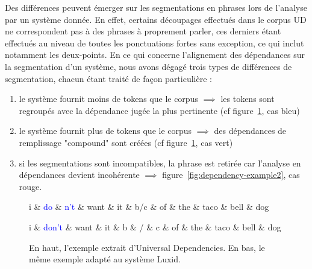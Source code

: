 \documentclass[PhD-Yoann-Dupont.tex]{subfiles}
\begin{document}
Des différences peuvent émerger sur les segmentations en phrases lors de l'analyse par un système donnée. En effet, certains découpages effectués dans le corpus UD ne correspondent pas à des phrases à proprement parler, ces derniers étant effectués au niveau de toutes les ponctuations fortes sans exception, ce qui inclut notamment les deux-points. En ce qui concerne l'alignement des dépendances sur la segmentation d'un système, nous avons dégagé trois types de différences de segmentation, chacun étant traité de façon particulière :
\begin{enumerate}
    \item le système fournit moins de tokens que le corpus $\implies$ les tokens sont regroupés avec la dépendance jugée la plus pertinente (cf figure\ \ref{fig:dependency-example1}, cas bleu)
    \item le système fournit plus de tokens que le corpus $\implies$ des dépendances de remplissage "compound" sont créées (cf figure\ \ref{fig:dependency-example1}, cas vert)
    \item si les segmentations sont incompatibles, la phrase est retirée car l'analyse en dépendances devient incohérente $\implies$ figure\ \ref{fig:dependency-example2}, cas rouge.
\end{enumerate}

\begin{figure}[ht!]
\centering
\begin{dependency}[theme = simple]
   \begin{deptext}[column sep=1.75em]
      i \& \textcolor{blue}{do} \& \textcolor{blue}{n't} \& want \& it \& \textcolor{green!80!black}{b/c} \& of \& the \& taco \& bell \& dog \\
   \end{deptext}
\end{dependency}
\begin{dependency}[theme = simple]
   \begin{deptext}[column sep=1.75em]
      i \& \textcolor{blue}{don't} \& want \& it \& \textcolor{green!80!black}{b} \& \textcolor{green!80!black}{/} \& \textcolor{green!80!black}{c} \& of \& the \& taco \& bell \& dog \\
   \end{deptext}
\end{dependency}
\caption{En haut, l'exemple extrait d'Universal Dependencies. En bas, le même exemple adapté au système Luxid.}
\label{fig:dependency-example1}
\end{figure}
\end{document}
